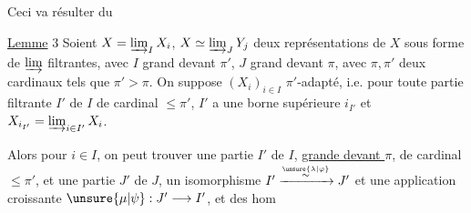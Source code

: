 

Ceci va résulter du

\uline{Lemme} 3 Soient $X=\varinjlim_I X_i$, $X\simeq\varinjlim_J Y_j$ deux représentations de $X$ sous forme de $\varinjlim$ filtrantes, avec $I$ grand devant $\pi'$, $J$ grand devant $\pi$, avec $\pi,\pi'$ deux cardinaux tels que $\pi'>\pi$. On suppose $(X_i)_{i\in I}$ $\pi'$-adapté, i.e. pour toute partie filtrante $I'$ de $I$ de cardinal $\leq\pi'$, $I'$ a une borne supérieure $i_{I'}$ et $X_{i_{I'}}=\varinjlim_{i\in I'} X_i$.

Alors pour  $i\in I$, on peut trouver une partie $I'$ de $I$,  \uline{grande devant $\pi$}, de cardinal $\leq\pi'$,  et une partie $J'$ de $J$,   un isomorphisme $I'\xrightarrow{\overset{\unsure{\lambda|\varphi}}{\sim}}J'$ et une application  croissante $\unsure{\mu|\psi}:J'\longrightarrow I'$,  et des hom

